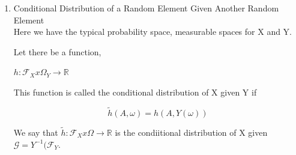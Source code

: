 \documentclass[11pt,fleqn]{book} %
\begin{document}
\begin{enumerate}
	\begin{theorem}[34.3 in Billingsly]
		
		If $X$ measurable $\mathcal{G}$, $Y \textcircled{m} \mathcal{F}$, then

				$$E(X Y||\mathcal{G}) = XE(Y ||\mathcal{G}) a.s. P $$
	\end{theorem}

	Other Properties

		\begin{enumerate}
			\item X, Y are random elements such that XY integrable P.
			\item If $\mathcal{G} \subseteq \mathcal{F}$ is the sub $\sigma$-field, then

					$$E(X E(Y||\mathcal{G})) = E(E(X ||\mathcal{G})Y) = E(E(X ||\mathcal{G}) E(Y ||\mathcal{G})) $$ 

			Conditional expectation is a self-adjoint operation. 

			\begin{proof}

			"Wire Theorem"\\

				$$\begin{aligned}
								E(X E(Y ||\mathcal{G}))	& = E( E(X E(Y ||\mathcal{G}) ||\mathcal{G}))\\
									&= E( E(Y ||\mathcal{G})E(X ||\mathcal{G}))	\\
									&= E( E(E(X ||\mathcal{G}) Y ||\mathcal{G})) \\
									&= 	E(E(X ||\mathcal{G}) Y)	
								\end{aligned}$$
			\end{proof}
		\end{enumerate}

	\item Conditional Distribution of a Random Element Given Another Random Element\\

		Here we have the typical probability space, measurable spaces for X and Y. 

		Let there be a function, 

			$h: \mathcal{F}_X x \Omega_Y \rightarrow \mathbb{R}$

		This function is called the conditional distribution of X given Y if 

				$$\tilde{h}(A, \omega) = h(A, Y(\omega)) $$

		We say that $\tilde{h}: \mathcal{F}_X x \Omega \rightarrow \mathbb{R}$ is the condiitional distribution of X given $\mathcal{G} = Y^{-1}(\mathcal{F}_Y$. 


\end{enumerate}
\end{document}
